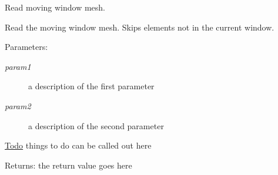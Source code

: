 Read moving window mesh. 

Read the moving window mesh. Skips elements not in the current window.

\begin{Desc}
\item[Parameters:]
\begin{description}
\item[{\em param1}]a description of the first parameter \item[{\em param2}]a description of the second parameter \end{description}
\end{Desc}
\begin{Desc}
\item[\hyperlink{todo__todo000004}{Todo}]things to do can be called out here \end{Desc}
\begin{Desc}
\item[Returns:]the return value goes here \end{Desc}

